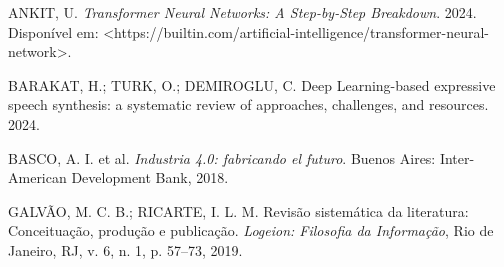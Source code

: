 \begin{thebibliography}{}
	
	{ANKIT, U. \emph{Transformer Neural Networks: A Step-by-Step Breakdown}. 2024. Dispon{\'i}vel em: <https://builtin.com/artificial-intelligence/transformer-neural-network>.}
	
	{BARAKAT, H.; TURK, O.; DEMIROGLU, C. Deep Learning-based expressive speech synthesis: a systematic review of approaches, challenges, and resources. 2024.}
	
	{BASCO, A. I. et al. \emph{Industria 4.0: fabricando el futuro}. Buenos Aires: Inter-American Development Bank, 2018.}
	
	{GALVÃO, M. C. B.; RICARTE, I. L. M. Revisão sistemática da literatura: Conceituação, produção e publicação. \emph{Logeion: Filosofia da Informação}, Rio de Janeiro, RJ, v. 6, n. 1, p. 57–73, 2019.}
	
\end{thebibliography}
